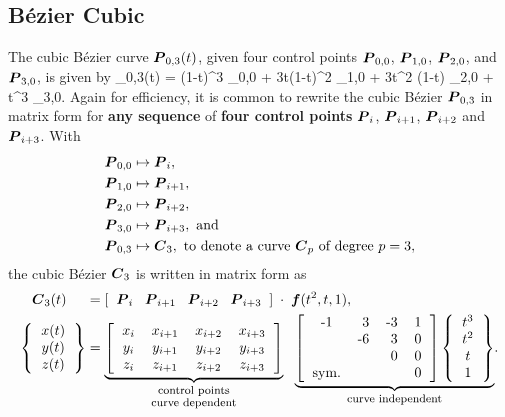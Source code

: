 \subsection{B\'ezier Cubic}
The cubic B\'ezier curve $\mbox{\boldmath $P$}_{0,3}(t)$, given four control points
$\mbox{\boldmath $P$}_{0,0}$,
$\mbox{\boldmath $P$}_{1,0}$,
$\mbox{\boldmath $P$}_{2,0}$, and
$\mbox{\boldmath $P$}_{3,0}$,
is given by
\be
\vP_{0,3}(t) = 
(1-t)^3 \vP_{0,0} + 
3t(1-t)^2 \vP_{1,0} + 
3t^2 (1-t) \vP_{2,0} + 
t^3 \vP_{3,0}.
\label{eq:bezier_cubic}
\ee
Again for efficiency, 
it is common to rewrite the cubic B\'ezier $\mbox{\boldmath $P$}_{0,3}$ 
in matrix form for {\bf any sequence} of {\bf four control 
points}
$\mbox{\boldmath $P$}_i$, $\mbox{\boldmath $P$}_{i+1}$, $\mbox{\boldmath $P$}_{i+2}$ and $\mbox{\boldmath $P$}_{i+3}$.
With
\begin{align}
\mbox{\boldmath $P$}_{0,0} & \mapsto \mbox{\boldmath $P$}_i, \\
\mbox{\boldmath $P$}_{1,0} & \mapsto \mbox{\boldmath $P$}_{i+1}, \\
\mbox{\boldmath $P$}_{2,0} & \mapsto \mbox{\boldmath $P$}_{i+2}, \\
\mbox{\boldmath $P$}_{3,0} & \mapsto \mbox{\boldmath $P$}_{i+3}, \mbox{ and } \\
\mbox{\boldmath $P$}_{0,3} & \mapsto \mbox{\boldmath $C$}_3, \mbox{ to denote a curve } \mbox{\boldmath $C$}_p \mbox { of degree } p=3,
\end{align}
the cubic B\'ezier $\mbox{\boldmath $C$}_3$ is written in matrix form as
\begin{align}
\vC_3(t) \;\;\;\;\; 
&= 
\left[\;\; \vP_i \;\;\; \vP_{i+1} \;\;\; \vP_{i+2} \;\;\; \vP_{i+3}
\;\; \right] \; \cdot \; \vf(t^2, t, 1),
\\
\left\{\begin{tabular}{c} $x(t)$ \\ $y(t)$ \\ $z(t)$ \end{tabular} \right\}
&= 
\underset{\underset{\mbox{\footnotesize curve dependent}}{\mbox{\footnotesize control points}}}{%
\underbrace{%
\left[\begin{tabular}{cccc}
$x_i$ 
& 
$x_{i+1}$ 
& 
$x_{i+2}$ 
& 
$x_{i+3}$ 
\\ 
$y_i$ 
& 
$y_{i+1}$ 
& 
$y_{i+2}$ 
& 
$y_{i+3}$ 
\\ 
$z_i$ 
& 
$z_{i+1}$ 
& 
$z_{i+2}$ 
& 
$z_{i+3}$ 
\end{tabular} \right]
}%
}%
%
\;\;\;
\underset{\mbox{\footnotesize curve independent}}{%
\underbrace{%
\left[\begin{tabular}{crrr}
-1 
& 
3
& 
-3
&
1
\\ 
% 
& 
-6
& 
3
&
0
\\ 
%
& 
% 
&
0
& 
0
\\
sym.
& 
% 
& 
% 
& 
0
\end{tabular} \right]
%
\left\{\begin{tabular}{c} $t^3$ \\ $t^2$ \\ $t$ \\ $1$ \end{tabular} \right\}
}%
}%
.
\end{align}


